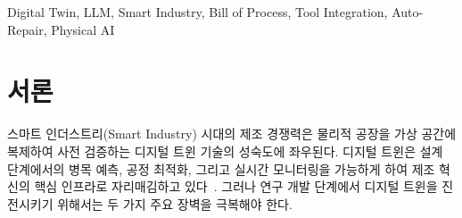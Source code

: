 
\begin{abstract}
스마트 인더스트리(Smart Industry) 시대의 핵심 기술인 디지털 트윈은 정교한 제조 데이터 확보와 시뮬레이션 프레임워크를 필요로 한다. 그러나 실제 산업 데이터는 기업의 핵심 보안 자산으로서 외부 접근이 제한되어 있고, 설계 정보를 분석 도구에 연결하는 인터페이스 비용이 과도하게 높다.

본 논문에서는 대규모 언어 모델(LLM)을 활용하여 공정 설계의 진입 장벽을 낮추고 도구 간 연동을 자동화하는 프레임워크인 GDP(Generative Digital-twin Prototyper)를 제안한다. GDP는 Siemens가 제안한 BOP(Bill of Process) 개념을 참조하되 LLM 생성 효율을 극대화한 독자적 공정 데이터 모델을 채택하며, 두 가지 사용자 그룹을 지원한다: (1)~제조 지식이 부족한 \textit{비전문가}가 제로샷 방식으로 연구용 모의 생산 라인을 설계할 수 있고, (2)~\textit{전문가}가 기존 스크립트 어댑터 자동 생성, AI 기반 분석 도구 합성, 스키마 가이드 최적화의 세 가지 도구 연동 방식을 통해 인터페이스 개발 비용을 대폭 절감할 수 있다. 특히 LLM이 실행 오류를 자율적으로 수정하는 Auto-Repair 메커니즘을 통해 연동 강건성을 확보한다.

실험 결과, 5종의 최신 LLM을 사용한 제로샷 공정 생성에서 최고 모델(Gemini 2.5 Flash)이 81.2\%의 정확도를 달성하였다. 전문가 인터뷰를 통해 도구 연동 기능의 실용적 가치를 확인하였으며, 비전문가가 생성한 모의 공정 데이터가 휴머노이드 로봇 및 피지컬 AI(Physical AI) 학습을 위한 가상 테스트베드로 활용될 잠재성을 제시한다.
\end{abstract}

\begin{IEEEkeywords}
Digital Twin, LLM, Smart Industry, Bill of Process, Tool Integration, Auto-Repair, Physical AI
\end{IEEEkeywords}

\section{서론}
\label{sec:introduction}

스마트 인더스트리(Smart Industry) 시대의 제조 경쟁력은 물리적 공장을 가상 공간에 복제하여 사전 검증하는 디지털 트윈 기술의 성숙도에 좌우된다. 디지털 트윈은 설계 단계에서의 병목 예측, 공정 최적화, 그리고 실시간 모니터링을 가능하게 하여 제조 혁신의 핵심 인프라로 자리매김하고 있다~\cite{b1}. 그러나 연구 개발 단계에서 디지털 트윈을 진전시키기 위해서는 두 가지 주요 장벽을 극복해야 한다.

